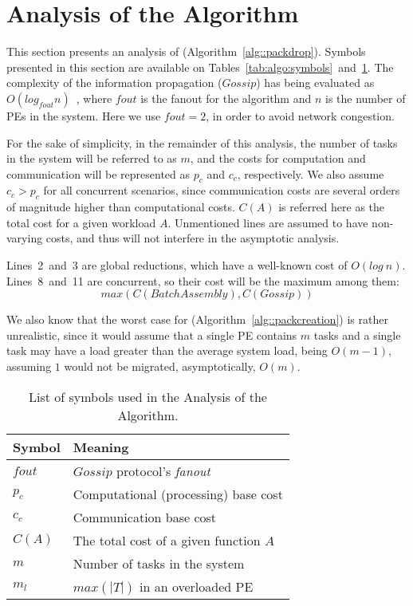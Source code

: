 \section{Analysis of the Algorithm} \label{sec:analysis}

This section presents an analysis of \packdrop (Algorithm~\ref{alg::packdrop}). 
Symbols presented in this section are available on Tables~\ref{tab:algo:symbols}~and~\ref{tab:analysis:symbols}.
The complexity of the information propagation ($Gossip$) has being evaluated as $O(log_{fout}n)$~\cite{grapevine},
where $fout$ is the fanout for the algorithm and $n$ is the number of PEs in the system.
Here we use $fout=2$, in order to avoid network congestion. 

For the sake of simplicity, in the remainder of this analysis, the number of tasks in the system
will be referred to as $m$, and the costs for computation and communication will be represented as $p_c$ and $c_c$, respectively.
We also assume $c_c > p_c$ for all concurrent scenarios, since communication costs are several orders of magnitude higher than computational costs.
$C(A)$ is referred here as the total cost for a given workload $A$.
Unmentioned lines are assumed to have non-varying costs, and thus will not interfere in the asymptotic analysis.

Lines~2~and~3 are global reductions, which have a well-known cost of $O(log\ n)$.
Lines~8~and~11 are concurrent, so their cost will be the maximum among them:
\begin{equation}
  max(C(BatchAssembly),C(Gossip))
\end{equation}

We also know that the worst case for \batchassembly (Algorithm~\ref{alg::packcreation}) is rather unrealistic, 
since it would assume that a single PE contains $m$ tasks and a single task may have a load greater than the average system load, being $O(m-1)$, assuming $1$ would not be migrated, asymptotically, $O(m)$.

\begin{table}[t]
	\caption{List of symbols used in the Analysis of the Algorithm.}
	\centering	
	\begin{tabular}{l l}
		\toprule
		\textbf{Symbol}		& \textbf{Meaning} \\
		\midrule
		$fout$			& $Gossip$ protocol's \textit{fanout} \\ 
		$p_c$			& Computational (processing) base cost \\
		$c_c$			& Communication base cost \\
		$C(A)$			& The total cost of a given function $A$ \\
		$m$				& Number of tasks in the system \\
		$m_l$			& $max(|T|)$ in an overloaded PE \\
		\bottomrule
	\end{tabular}
	\label{tab:analysis:symbols}
\end{table}

